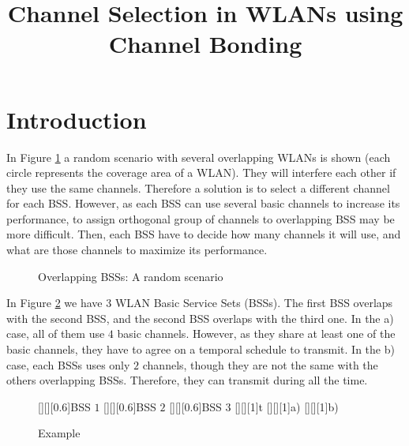 \documentclass[11pt]{article}
\begin{document}
\title{Channel Selection in WLANs using Channel Bonding}  


\maketitle





\section{Introduction} \label{Sec:Intro}

In Figure \ref{Fig:RandomScenario} a random scenario with several overlapping WLANs is shown (each circle represents the coverage area of a WLAN). They will interfere each other if they use the same channels. Therefore a solution is to select a different channel for each BSS. However, as each BSS can use several basic channels to increase its performance, to assign orthogonal group of channels to overlapping BSS may be more difficult. Then, each BSS have to decide how many channels it will use, and what are those channels to maximize its performance.

\begin{figure}[t!]
	\centering
	\caption{Overlapping BSSs: A random scenario}\label{Fig:RandomScenario}
\end{figure}

In Figure \ref{Fig:Ex_ChannelBonding} we have $3$ WLAN Basic Service Sets (BSSs). The first BSS overlaps with the second BSS, and the second BSS overlaps with the third one. In the a) case, all of them use $4$ basic channels. However, as they share at least one of the basic channels, they have to agree on a temporal schedule to transmit. In the b) case, each BSSs uses only $2$ channels, though they are not the same with the others overlapping BSSs. Therefore, they can transmit during all the time.

\begin{figure}[t!]
	[][][0.6]{BSS $1$}
	[][][0.6]{BSS $2$}
	[][][0.6]{BSS $3$}		
	[][][1]{t}	
	[][][1]{a)}		
	[][][1]{b)}			
	\centering
	\caption{Example}\label{Fig:Ex_ChannelBonding}
\end{figure}
\end{document}
